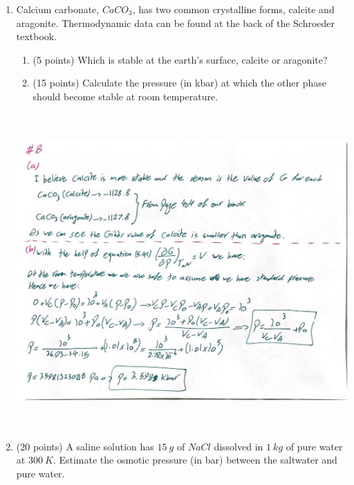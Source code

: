 \documentclass[fleqn]{article}
\begin{document}
\begin{enumerate}
    \pagebreak

    \item Calcium carbonate, $CaCO_3$, has two common crystalline forms, calcite and aragonite. Thermodynamic 
    data can be found at the back of the Schroeder textbook.
    \begin{enumerate}
      \item (5 points) Which is stable at the earth's surface, calcite or aragonite?

      \item (15 points) Calculate the pressure (in kbar) at which the other phase should become stable
      at room temperature.
    \end{enumerate}

    \begin{center}
      \includegraphics[height=12cm, width=15cm]{8.JPG}
    \end{center}

    \pagebreak

    \item (20 points) A saline solution has $15 ~ g$ of $NaCl$ dissolved in $1 ~ kg$ of pure water at $300 ~ K$. Estimate
    the osmotic pressure (in bar) between the saltwater and pure water.


\end{enumerate}
\end{document}
